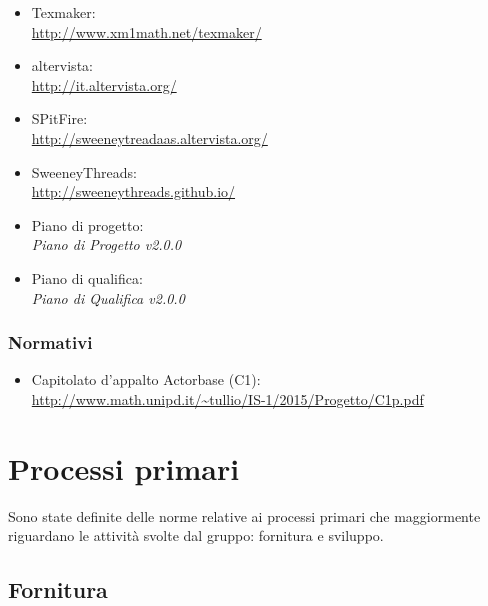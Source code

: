 \documentclass[a4paper]{article}
\begin{document}
\begin{itemize}
					\item Texmaker: \\ \url{http://www.xm1math.net/texmaker/}
					\item altervista: \\ \url{http://it.altervista.org/}
					\item SPitFire: \\ \url{http://sweeneytreadaas.altervista.org/}
					\item SweeneyThreads: \\ \url{http://sweeneythreads.github.io/}
					\item Piano di progetto: \\ \emph{Piano di Progetto v2.0.0}
					\item Piano di qualifica: \\ \emph{Piano di Qualifica v2.0.0}
				\end{itemize}
			\subsubsection{Normativi}
				\begin{itemize}
					\item Capitolato d'appalto Actorbase (C1): \\
					\url{http://www.math.unipd.it/~tullio/IS-1/2015/Progetto/C1p.pdf}
				\end{itemize}

	\newpage
	\section{Processi primari}
		Sono state definite delle norme relative ai processi primari che maggiormente riguardano le attività
		svolte dal gruppo: fornitura e sviluppo.
		\subsection{Fornitura}
\end{document}
